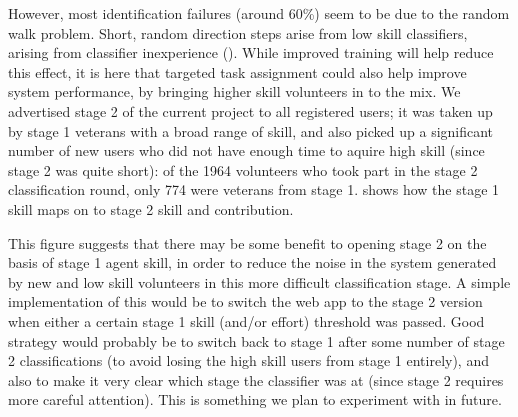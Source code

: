 \documentclass[useAMS,usenatbib,a4paper]{mn2e}
\begin{document}
However, most identification failures (around 60\%) seem to be due to the
random walk problem. Short, random direction steps arise from low skill
classifiers, arising from classifier inexperience (). 
While improved training will help reduce this effect, it is here
that targeted task assignment could also help improve system performance, by
bringing higher skill volunteers in to the mix. We
advertised stage 2 of the current project to all registered users; it was
taken up by stage 1 veterans with a broad range of skill, and also picked up a
significant number of new users who did not have enough time to aquire high
skill (since stage 2 was quite short): of the 1964 volunteers who took part in
the stage 2 classification round, only 774 were veterans from stage 1.
 shows how the stage 1 skill maps
on to stage 2 skill and contribution.

This figure suggests that there may be some benefit to opening stage 2 on the
basis of stage 1 agent skill, in order to reduce the noise in the system
generated by new and low skill volunteers in this more difficult
classification stage.  A simple implementation of this would be to switch the
web app to the stage 2 version when either a certain stage 1 skill (and/or
effort) threshold was passed. Good strategy would probably be to switch back
to stage 1 after some number of stage 2 classifications (to avoid losing the
high skill users from stage 1 entirely), and also to make it very clear which
stage the classifier was at (since stage 2 requires more careful attention).
This is something we plan to experiment with in future.
\end{document}
